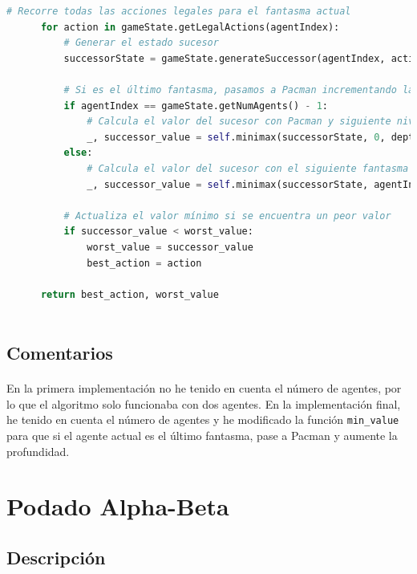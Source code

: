 \documentclass{report}
\begin{document}
\begin{lstlisting}[language=Python, caption=Implementación final del agente Minimax]
      # Recorre todas las acciones legales para el fantasma actual
      for action in gameState.getLegalActions(agentIndex):
          # Generar el estado sucesor
          successorState = gameState.generateSuccessor(agentIndex, action)
          
          # Si es el último fantasma, pasamos a Pacman incrementando la profundidad
          if agentIndex == gameState.getNumAgents() - 1:
              # Calcula el valor del sucesor con Pacman y siguiente nivel de profundidad
              _, successor_value = self.minimax(successorState, 0, depth + 1)
          else:
              # Calcula el valor del sucesor con el siguiente fantasma
              _, successor_value = self.minimax(successorState, agentIndex + 1, depth)

          # Actualiza el valor mínimo si se encuentra un peor valor
          if successor_value < worst_value:
              worst_value = successor_value
              best_action = action

      return best_action, worst_value
        
          \end{lstlisting}
        \subsection*{Comentarios}
          \paragraph*{}{
            En la primera implementación no he tenido en cuenta el número de agentes, por lo que el algoritmo solo funcionaba con dos agentes. En la implementación final, he tenido en cuenta el número de agentes y he modificado la función \texttt{min\_value} para que si el agente actual es el último fantasma, pase a Pacman y aumente la profundidad.
          }
      \clearpage\section{Podado Alpha-Beta}
        \subsection*{Descripción}
\end{document}
